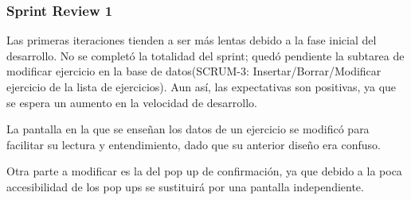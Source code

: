 \subsubsection{Sprint Review 1}
Las primeras iteraciones tienden a ser más lentas debido a la fase inicial del desarrollo. No se completó la totalidad del sprint; quedó pendiente la subtarea de modificar ejercicio en la base de datos(SCRUM-3: Insertar/Borrar/Modificar ejercicio de la lista de ejercicios). Aun así, las expectativas son positivas, ya que se espera un aumento en la velocidad de desarrollo.

La pantalla en la que se enseñan los datos de un ejercicio se modificó para facilitar su lectura y entendimiento, dado que su anterior diseño era confuso.

Otra parte a modificar es la del pop up de confirmación, ya que debido a la poca accesibilidad de los pop ups se sustituirá por una pantalla independiente.

